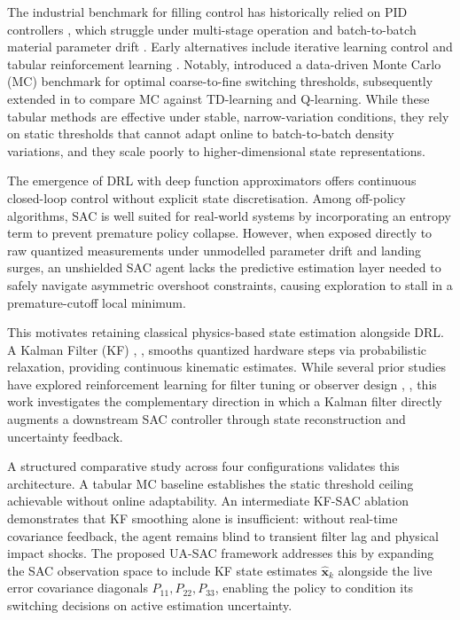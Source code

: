 \documentclass[conference]{IEEEtran}
\begin{document}
The industrial benchmark for filling control has 
historically relied on PID controllers \cite{ogata2010}, 
which struggle under multi-stage operation and 
batch-to-batch material parameter drift \cite{sato2010}. 
Early alternatives include iterative learning control 
\cite{an2018,you2018} and tabular reinforcement learning 
\cite{sutton2018}. Notably, \cite{emeksiz2023} introduced 
a data-driven Monte Carlo (MC) benchmark for optimal coarse-to-fine 
switching thresholds, subsequently extended in 
\cite{emeksiz2025} to compare MC against TD-learning and 
Q-learning. While these tabular methods are effective 
under stable, narrow-variation conditions, they rely on 
static thresholds that cannot adapt online to 
batch-to-batch density variations, and they scale poorly 
to higher-dimensional state representations.

The emergence of DRL with deep function approximators 
\cite{mnih2015} offers continuous closed-loop control 
without explicit state discretisation. Among off-policy 
algorithms, SAC \cite{haarnoja2018} is well suited for 
real-world systems by incorporating an entropy term to 
prevent premature policy collapse. However, when exposed 
directly to raw quantized measurements under unmodelled 
parameter drift and landing surges, an unshielded SAC 
agent lacks the predictive estimation layer needed to 
safely navigate asymmetric overshoot constraints, causing 
exploration to stall in a premature-cutoff local minimum.

This motivates retaining classical physics-based state 
estimation alongside DRL. A Kalman Filter (KF) 
\cite{kalman1960}, \cite{simon2006}, \cite{barshalom2001} smooths 
quantized hardware steps via probabilistic relaxation, 
providing continuous kinematic estimates. While several 
prior studies have explored reinforcement learning for 
filter tuning or observer design \cite{tang2021}, \cite{ristic2026}, 
this work investigates the complementary direction in 
which a Kalman filter directly augments a downstream 
SAC controller through state reconstruction and 
uncertainty feedback.

A structured comparative study across four configurations 
validates this architecture. A tabular MC baseline 
\cite{emeksiz2023,sutton2018} establishes the static 
threshold ceiling achievable without online adaptability. 
An intermediate KF-SAC ablation demonstrates that KF 
smoothing alone is insufficient: without real-time 
covariance feedback, the agent remains blind to transient 
filter lag and physical impact shocks. The proposed 
UA-SAC framework addresses this by expanding the SAC 
observation space to include KF state estimates 
$\hat{\mathbf{x}}_k$ alongside the live error covariance 
diagonals $P_{11}, P_{22}, P_{33}$, enabling the policy 
to condition its switching decisions on active estimation 
uncertainty.
\end{document}
